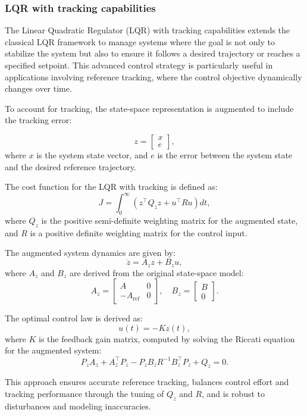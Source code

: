 \subsubsection{LQR with tracking capabilities}
\label{subsubsec:lqr_tracking}

The Linear Quadratic Regulator (LQR) with tracking capabilities extends the classical LQR framework to manage systems where the goal is not only to stabilize the system but also to ensure it follows a desired trajectory or reaches a specified setpoint. This advanced control strategy is particularly useful in applications involving reference tracking, where the control objective dynamically changes over time.

To account for tracking, the state-space representation is augmented to include the tracking error:

\[
    z = \begin{bmatrix} x \\ e \end{bmatrix},
\]
where \(x\) is the system state vector, and \(e\) is the error between the system state and the desired reference trajectory.

The cost function for the LQR with tracking is defined as:
\[
    J = \int_0^\infty \left( z^\top Q_z z + u^\top R u \right) dt,
\]
where \(Q_z\) is the positive semi-definite weighting matrix for the augmented state, and \(R\) is a positive definite weighting matrix for the control input.

The augmented system dynamics are given by:
\[
    \dot{z} = A_z z + B_z u,
\]
where \(A_z\) and \(B_z\) are derived from the original state-space model:
\[
    A_z = \begin{bmatrix} A & 0 \\ -A_{\text{ref}} & 0 \end{bmatrix}, \quad
    B_z = \begin{bmatrix} B \\ 0 \end{bmatrix}.
\]

The optimal control law is derived as:
\[
    u(t) = -K z(t),
\]
where \(K\) is the feedback gain matrix, computed by solving the Riccati equation for the augmented system:
\[
    P_z A_z + A_z^\top P_z - P_z B_z R^{-1} B_z^\top P_z + Q_z = 0.
\]

This approach ensures accurate reference tracking, balances control effort and tracking performance through the tuning of \(Q_z\) and \(R\), and is robust to disturbances and modeling inaccuracies.

